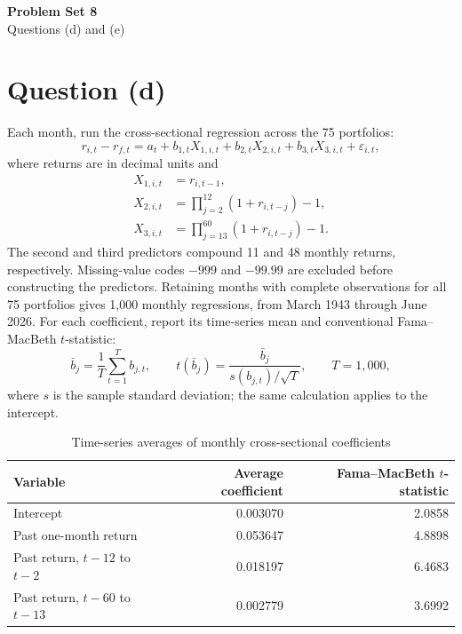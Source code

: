 \documentclass[11pt]{article}
\begin{document}
\begin{center}
    {\Large\bfseries Problem Set 8}\\[4pt]
    Questions (d) and (e)
\end{center}

\section*{Question (d)}

Each month, run the cross-sectional regression across the 75 portfolios:
\begin{equation}
 r_{i,t}-r_{f,t}=a_t+b_{1,t}X_{1,i,t}+b_{2,t}X_{2,i,t}
                    +b_{3,t}X_{3,i,t}+\varepsilon_{i,t},
 \label{eq:fmb}
\end{equation}
where returns are in decimal units and
\begin{equation}
\begin{aligned}
 X_{1,i,t}&=r_{i,t-1},\\
 X_{2,i,t}&=\prod\nolimits_{j=2}^{12}(1+r_{i,t-j})-1,\\
 X_{3,i,t}&=\prod\nolimits_{j=13}^{60}(1+r_{i,t-j})-1.
\end{aligned}
\label{eq:predictors}
\end{equation}
The second and third predictors compound 11 and 48 monthly returns, respectively.
Missing-value codes $-999$ and $-99.99$ are excluded before constructing the
predictors. Retaining months with complete observations for all 75 portfolios
gives 1,000 monthly regressions, from March 1943 through June 2026.
For each coefficient, report its time-series mean and conventional
Fama--MacBeth $t$-statistic:
\begin{equation}
 \bar b_j=\frac{1}{T}\sum_{t=1}^{T}b_{j,t},\qquad
 t(\bar b_j)=\frac{\bar b_j}{s(b_{j,t})/\sqrt{T}},\qquad T=1{,}000,
 \label{eq:fmb-stat}
\end{equation}
where $s$ is the sample standard deviation; the same calculation applies to the intercept.

\begin{table}[htbp]
\centering
\caption{Time-series averages of monthly cross-sectional coefficients}
\label{tab:fmb}
\begin{tabular}{lrr}
\toprule
Variable & Average coefficient & Fama--MacBeth $t$-statistic\\
\midrule
Intercept & 0.003070 & 2.0858\\
Past one-month return & 0.053647 & 4.8898\\
Past return, $t-12$ to $t-2$ & 0.018197 & 6.4683\\
Past return, $t-60$ to $t-13$ & 0.002779 & 3.6992\\
\bottomrule
\end{tabular}
\end{table}
\end{document}
